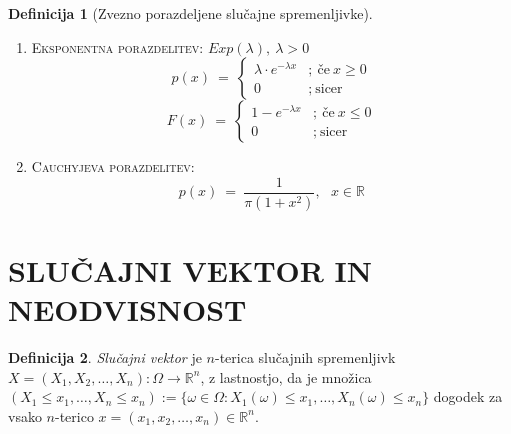 \documentclass[11pt]{article}
\theoremstyle{definition}
\newtheorem{definicija}{Definicija}[section]
\theoremstyle{definition}
\theoremstyle{definition}
\begin{document}
\begin{definicija}[Zvezno porazdeljene slučajne spremenljivke]
\begin{enumerate}
	\item \textsc{Eksponentna porazdelitev}: $Exp(\lambda), ~\lambda > 0$
	$$p(x) ~=~ \begin{cases}
		\lambda \cdot e^{-\lambda x} &; ~\text{če}~ x \geq 0 \\
		0 &; ~\text{sicer}~
	\end{cases}$$
	$$F(x) ~=~ \begin{cases}
		1 - e^{-\lambda x} &; ~\text{če}~ x \leq 0 \\
		0 &; ~\text{sicer}
	\end{cases}$$
	
	\item \textsc{Cauchyjeva porazdelitev}:
	$$p(x) ~=~ \frac{1}{\pi (1 + x^2)}, ~~~x \in \mathbb{R}$$
\end{enumerate}

\end{definicija}
\vspace{0.5cm}

\pagebreak


\section{SLUČAJNI VEKTOR IN NEODVISNOST}
\vspace{0.5cm}

\begin{definicija}

\textit{Slučajni vektor} je $n$-terica slučajnih spremenljivk \\$X = (X_1, X_2, \ldots, X_n): \Omega \rightarrow \mathbb{R}^n$, z lastnostjo, da je množica \\$(X_1 \leq x_1, \ldots, X_n \leq x_n) := \{ \omega \in \Omega: X_1(\omega) \leq x_1, \ldots, X_n(\omega) \leq x_n \}$ dogodek za vsako $n$-terico $x = (x_1, x_2, \ldots, x_n) \in \mathbb{R}^n$.

\end{definicija}
\vspace{0.5cm}
\end{document}
